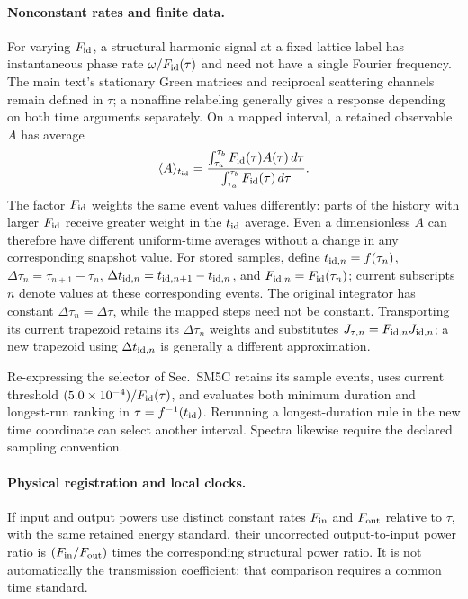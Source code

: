 \documentclass[10pt,aps,onecolumn,notitlepage,nofootinbib]{revtex4-2}
\begin{document}
\paragraph*{Nonconstant rates and finite data.}
For varying $F_{\rm id}$, a structural harmonic signal at a fixed lattice label has instantaneous phase rate $\omega/F_{\rm id}(\tau)$ and need not have a single Fourier frequency. The main text's stationary Green matrices and reciprocal scattering channels remain defined in $\tau$; a nonaffine relabeling generally gives a response depending on both time arguments separately. On a mapped interval, a retained observable $A$ has average
\[
 \langle A\rangle_{t_{\rm id}}
 =\frac{\int_{\tau_a}^{\tau_b}F_{\rm id}(\tau)A(\tau)\,d\tau}
 {\int_{\tau_a}^{\tau_b}F_{\rm id}(\tau)\,d\tau}.
\]
The factor $F_{\rm id}$ weights the same event values differently: parts of the history with larger $F_{\rm id}$ receive greater weight in the $t_{\rm id}$ average. Even a dimensionless $A$ can therefore have different uniform-time averages without a change in any corresponding snapshot value. For stored samples, define $t_{{\rm id},n}=f(\tau_n)$, $\Delta\tau_n=\tau_{n+1}-\tau_n$, $\Delta t_{{\rm id},n}=t_{{\rm id},n+1}-t_{{\rm id},n}$, and $F_{{\rm id},n}=F_{\rm id}(\tau_n)$; current subscripts $n$ denote values at these corresponding events. The original integrator has constant $\Delta\tau_n=\Delta\tau$, while the mapped steps need not be constant. Transporting its current trapezoid retains its $\Delta\tau_n$ weights and substitutes $J_{\tau,n}=F_{{\rm id},n}J_{{\rm id},n}$; a new trapezoid using $\Delta t_{{\rm id},n}$ is generally a different approximation.

Re-expressing the selector of Sec.~SM5C retains its sample events, uses current threshold $(5.0\times10^{-4})/F_{\rm id}(\tau)$, and evaluates both minimum duration and longest-run ranking in $\tau=f^{-1}(t_{\rm id})$. Rerunning a longest-duration rule in the new time coordinate can select another interval. Spectra likewise require the declared sampling convention.

\paragraph*{Physical registration and local clocks.}
If input and output powers use distinct constant rates $F_{\rm in}$ and $F_{\rm out}$ relative to $\tau$, with the same retained energy standard, their uncorrected output-to-input power ratio is $(F_{\rm in}/F_{\rm out})$ times the corresponding structural power ratio. It is not automatically the transmission coefficient; that comparison requires a common time standard.
\end{document}
